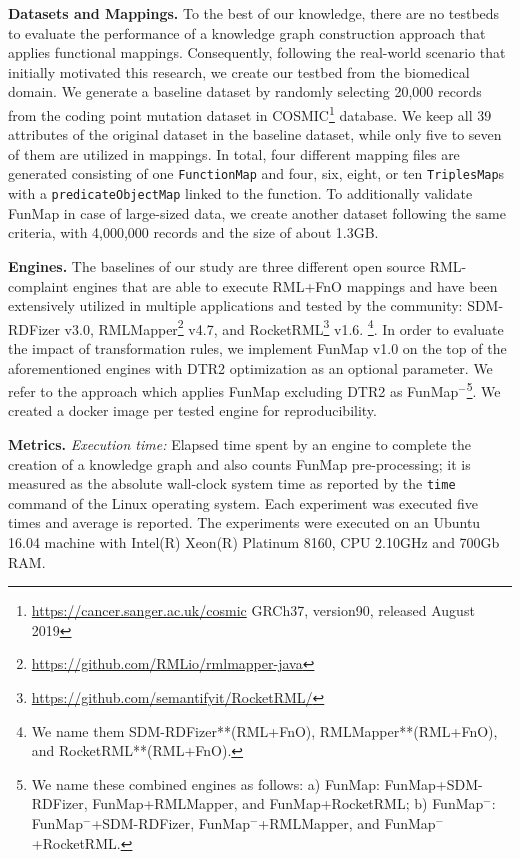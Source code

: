 \noindent\textbf{Datasets and Mappings.}
To the best of our knowledge, there are no testbeds to evaluate the performance of a knowledge graph construction approach that applies functional mappings. Consequently, following the real-world scenario that initially motivated this research, we create our testbed from the biomedical domain. We generate a baseline dataset by randomly selecting 20,000 records from the coding point mutation dataset in COSMIC\footnote{\url{https://cancer.sanger.ac.uk/cosmic} GRCh37, version90, released August 2019} database. We keep all 39 attributes of the original dataset in the baseline dataset, while only five to seven of them are utilized in mappings. In total, four different mapping files are generated consisting of one \verb|FunctionMap| and four, six, eight, or ten \verb|TriplesMap|s with a \verb|predicateObjectMap| linked to the function. To additionally validate FunMap in case of large-sized data, we create another dataset following the same criteria, with 4,000,000 records and the size of about 1.3GB.

\noindent\textbf{Engines.}
The baselines of our study are three different open source RML-complaint engines that are able to execute RML+FnO mappings and have been extensively utilized in multiple applications and tested by the community: SDM-RDFizer v3.0\citep{IJC20}, RMLMapper\footnote{\url{https://github.com/RMLio/rmlmapper-java}} v4.7, and RocketRML\footnote{\url{https://github.com/semantifyit/RocketRML/}} v1.6. \footnote{We name them SDM-RDFizer**(RML+FnO), RMLMapper**(RML+FnO), and RocketRML**(RML+FnO).}. In order to evaluate the impact of transformation rules, we implement FunMap v1.0 on the top of the aforementioned engines with DTR2 optimization as an optional parameter. We refer to the approach which applies FunMap excluding DTR2 as FunMap$^-$\footnote{We name these combined engines as follows: a) FunMap: FunMap+SDM-RDFizer, FunMap+RMLMapper, and FunMap+RocketRML; b) FunMap$^-$: FunMap$^-$+SDM-RDFizer, FunMap$^-$+RMLMapper, and FunMap$^-$+RocketRML.}. We created a docker image per tested engine for reproducibility.  

\noindent\textbf{Metrics.} \textit{Execution time:} Elapsed time spent by an engine to complete the creation of a knowledge graph and also counts FunMap pre-processing; it is measured as the absolute wall-clock system time as reported by the \verb|time| command of the Linux operating system. Each experiment was executed five times and average is reported. The experiments were executed on an Ubuntu 16.04 machine with Intel(R) Xeon(R) Platinum 8160, CPU 2.10GHz and 700Gb RAM. 

